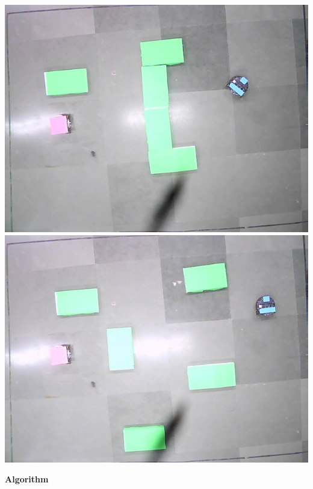 \documentclass[report]{res}
\begin{document}
	\begin{center}
	\includegraphics[scale = 0.8]{graphics/case1/cap_image.jpeg}\\
	\includegraphics[scale = 0.8]{graphics/case2/cap_image.jpeg}\\
	\end{center}
	
	\pagebreak
	
	
	\begin{center}
		\textbf{\huge Algorithm} \\
	\end{center}
	
\end{document}
